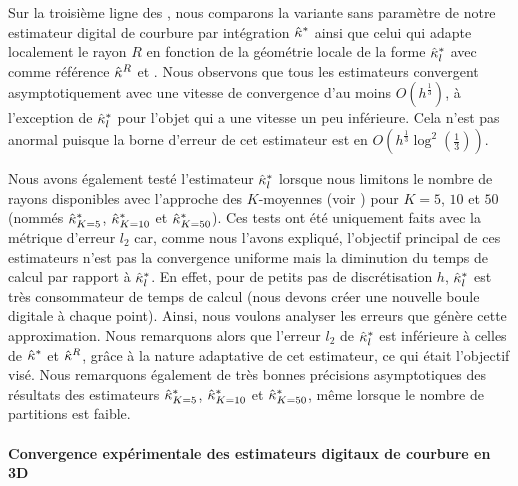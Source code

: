 Sur la troisième ligne des
, nous
comparons la variante sans paramètre de notre estimateur digital de courbure par
intégration $\hat{\kappa}^{*}$ ainsi que celui qui adapte localement le rayon $R$ en
fonction de la géométrie locale de la forme $\hat{\kappa}^{*}_{l}$ avec comme référence
$\hat{\kappa}^{R}$ et \MDCA. Nous observons que tous les estimateurs convergent
asymptotiquement avec une vitesse de convergence d'au moins $O(h^\frac{1}{3})$, à
l'exception de $\hat{\kappa}^{*}_{l}$ pour l'objet \Ellipse qui a une vitesse un peu
inférieure. Cela n'est pas anormal puisque la borne d'erreur de cet estimateur
est en $O\left(h^\frac{1}{3} \log^2\left(\frac{1}{3}\right)\right)$.


Nous avons également testé l'estimateur $\hat{\kappa}^{*}_{l}$ lorsque nous limitons le
nombre de rayons disponibles avec l'approche des $K$-moyennes (voir
) pour $K = 5$, $10$ et $50$
(nommés $\hat{\kappa}^{*}_{K=5}$, $\hat{\kappa}^{*}_{K=10}$ et $\hat{\kappa}^{*}_{K=50}$). Ces tests ont été
uniquement faits avec la métrique d'erreur $l_2$ car, comme nous l'avons
expliqué, l'objectif principal de ces estimateurs n'est pas la convergence
uniforme mais la diminution du temps de calcul par rapport à $\hat{\kappa}^{*}_{l}$. En
effet, pour de petits pas de discrétisation $h$, $\hat{\kappa}^{*}_{l}$ est très
consommateur de temps de calcul (nous devons créer une nouvelle boule digitale à
chaque point). Ainsi, nous voulons analyser les erreurs que génère cette
approximation. Nous remarquons alors que l'erreur $l_2$ de $\hat{\kappa}^{*}_{l}$ est
inférieure à celles de $\hat{\kappa}^{*}$ et $\hat{\kappa}^{R}$, grâce à la nature adaptative de
cet estimateur, ce qui était l'objectif visé. Nous remarquons également de très bonnes précisions
asymptotiques des résultats des estimateurs $\hat{\kappa}^{*}_{K=5}$, $\hat{\kappa}^{*}_{K=10}$ et
$\hat{\kappa}^{*}_{K=50}$, même lorsque le nombre de partitions est faible.

\paragraph{Convergence expérimentale des estimateurs digitaux de courbure en 3D}

